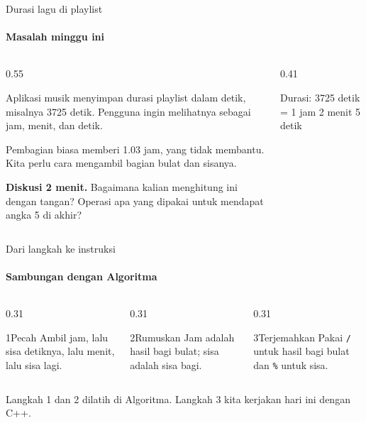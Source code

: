 \documentclass[t]{beamer}
\begin{document}

\begin{frame}[fragile]{Durasi lagu di playlist}
\framesubtitle{Masalah minggu ini}
\begin{columns}[T]
\begin{column}{0.55\textwidth}
{Aplikasi musik menyimpan durasi playlist dalam detik, misalnya 3725 detik. Pengguna ingin melihatnya sebagai jam, menit, dan detik.

\vspace{6pt}
Pembagian biasa memberi 1.03 jam, yang tidak membantu. Kita perlu cara mengambil bagian bulat dan sisanya.\par}
\vspace{6pt}
\begin{Catatan}
\textbf{Diskusi 2 menit.} Bagaimana kalian menghitung ini dengan tangan? Operasi apa yang dipakai untuk mendapat angka 5 di akhir?
\end{Catatan}
\end{column}
\begin{column}{0.41\textwidth}
\begin{Keluaran}[]
Durasi: 3725 detik
= 1 jam 2 menit 5 detik
\end{Keluaran}
\end{column}
\end{columns}
\end{frame}

\begin{frame}{Dari langkah ke instruksi}
\framesubtitle{Sambungan dengan Algoritma}
\begin{columns}[T]
\begin{column}{0.31\textwidth}
\begin{Langkah}{1}{Pecah}
Ambil jam, lalu sisa detiknya, lalu menit, lalu sisa lagi.
\end{Langkah}
\end{column}
\begin{column}{0.31\textwidth}
\begin{Langkah}{2}{Rumuskan}
Jam adalah hasil bagi bulat; sisa adalah sisa bagi.
\end{Langkah}
\end{column}
\begin{column}{0.31\textwidth}
\begin{Langkah}{3}{Terjemahkan}
Pakai \texttt{/} untuk hasil bagi bulat dan \texttt{\%} untuk sisa.
\end{Langkah}
\end{column}
\end{columns}
\vspace{10pt}
Langkah 1 dan 2 dilatih di Algoritma. Langkah 3 kita kerjakan hari ini dengan C++.
\end{frame}
\end{document}
